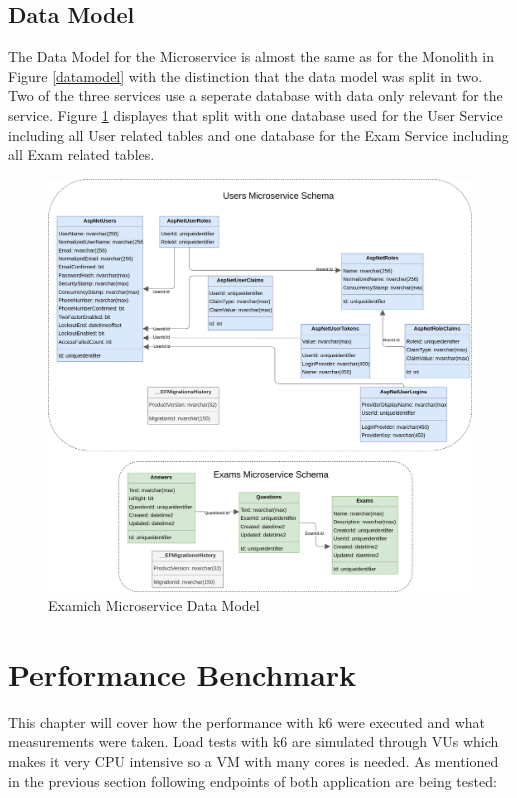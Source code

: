 \documentclass[BIF,Bachelor,nenglish]{twbook}%
\begin{document}
\subsection{Data Model}
The Data Model for the Microservice is almost the same as for the Monolith in Figure \ref{datamodel} with the distinction that the data model was split in two. Two of the three services use a seperate database with data only relevant for the service. Figure \ref{datamodelmicroservice} displayes that split with one database used for the User Service including all User related tables and one database for the Exam Service including all Exam related tables.
\begin{figure} [H]
 \begin{center}
    \includegraphics[width=1\linewidth]{img/ExamichMicroserviceDataModel.png}
 \end{center}
 \caption{Examich Microservice Data Model}
 \label{datamodelmicroservice}
\end{figure}

\section{Performance Benchmark}
This chapter will cover how the performance with k6 were executed and what measurements were taken. Load tests with k6 are simulated through \ac{VU}s which makes it very CPU intensive so a VM with many cores is needed. As mentioned in the previous section following endpoints of both application are being tested:
\end{document}
